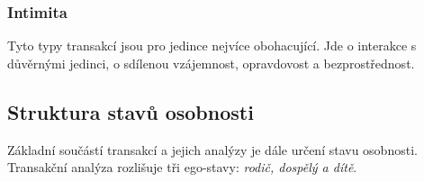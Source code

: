 \subsubsection*{Intimita}
Tyto typy transakcí jsou pro jedince nejvíce obohacující. 
Jde o interakce s důvěrnými jedinci, o sdílenou vzájemnost, opravdovost a bezprostřednost.\\

\subsection*{Struktura stavů osobnosti}

Základní součástí transakcí a jejich analýzy je dále určení stavu osobnosti. 
Transakční analýza rozlišuje tři ego-stavy: {\it rodič, dospělý a dítě}.





